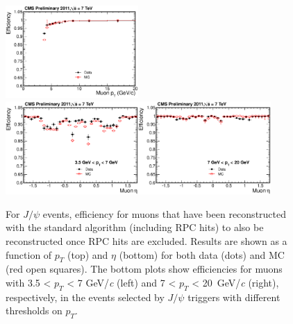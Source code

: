 \documentclass{JINST}
\begin{document}
\begin{figure}
  \begin{center}
    \texttt{\includegraphics[width=0.45\textwidth]{RelEff_Medium_pt_PLOT}}\\
    \vspace{0.3cm}
    \texttt{\includegraphics[width=0.45\textwidth]{RelEff_Medium_eta_PLOT_pt_bin0}}\hspace{0.5cm}\texttt{\includegraphics[width=0.45\textwidth]{RelEff_Medium_eta_PLOT_pt_bin1}}
    \caption{
    For $J/\psi$ events, efficiency for muons that have been reconstructed with the standard algorithm (including RPC hits) to also be reconstructed once RPC hits are excluded.
Results are shown as a function of $p_T$ (top) and $\eta$ (bottom) for both data (dots) and MC (red open squares). The bottom plots show efficiencies for muons with 3.5 < $p_T$ < 7 GeV/\emph{c} (left) and 7 < $p_T$ < 20~GeV/\emph{c} (right), respectively, in the events selected by $J/\psi$ triggers with different thresholds on $p_T$.
    }
    \label{fig:muEffRel}
    \vspace{-0.3cm}
  \end{center}
\end{figure}
\end{document}
